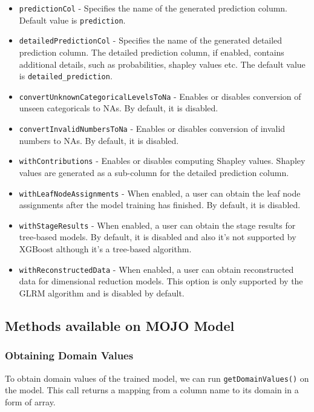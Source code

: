 \begin{itemize}
    \item \texttt{predictionCol} - Specifies the name of the generated prediction column. Default value is \texttt{prediction}.
    \item \texttt{detailedPredictionCol} - Specifies the name of the generated detailed prediction column. The detailed prediction column, if enabled, contains additional details, such as probabilities, shapley values etc. The default value is \texttt{detailed\_prediction}.
    \item \texttt{convertUnknownCategoricalLevelsToNa} - Enables or disables conversion of unseen categoricals to NAs. By default, it is disabled.
    \item \texttt{convertInvalidNumbersToNa} - Enables or disables conversion of invalid numbers to NAs. By default, it is disabled.
    \item \texttt{withContributions} - Enables or disables computing Shapley values. Shapley values are generated as a sub-column for the detailed prediction column.
    \item \texttt{withLeafNodeAssignments} - When enabled, a user can obtain the leaf node assignments after the model training has finished. By default, it is disabled.
    \item \texttt{withStageResults} - When enabled, a user can obtain the stage results for tree-based models. By default, it is disabled and also it's not supported by XGBoost although it's a tree-based algorithm.
    \item \texttt{withReconstructedData} - When enabled, a user can obtain reconstructed data for dimensional reduction models. This option is only supported by the GLRM algorithm and is disabled by default.
\end{itemize}

\subsection{Methods available on MOJO Model}

\subsubsection{Obtaining Domain Values}

To obtain domain values of the trained model, we can run \texttt{getDomainValues()} on the model. This call
returns a mapping from a column name to its domain in a form of array.

